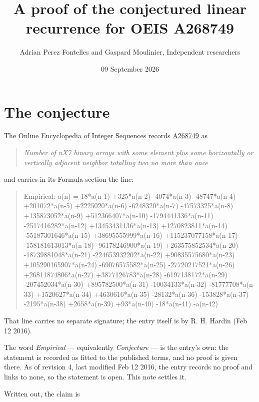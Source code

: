 \documentclass[11pt]{article}
\title{A proof of the conjectured linear recurrence for OEIS A268749}
\author{Adrian Perez Fontelles and Gaspard Moulinier, Independent researchers}
\date{09 September 2026}
\theoremstyle{definition}
\begin{document}
\maketitle
\section{The conjecture}

The Online Encyclopedia of Integer Sequences records \href{https://oeis.org/A268749}{A268749} as

\begin{quote}\itshape Number of nX7 binary arrays with some element plus some horizontally or vertically adjacent neighbor totalling two no more than once\end{quote}

and carries in its Formula section the line:

\begin{quote}\ttfamily Empirical: a(n) = 18*a(n-1) +325*a(n-2) -4074*a(n-3) -48747*a(n-4) +201072*a(n-5) +2225020*a(n-6) -6248320*a(n-7) -47573325*a(n-8) +135873052*a(n-9) +512366407*a(n-10) -1794441336*a(n-11) -2517416282*a(n-12) +13453431136*a(n-13) +1270823811*a(n-14) -55187301646*a(n-15) +38695555999*a(n-16) +115237077158*a(n-17) -158181613013*a(n-18) -96178246900*a(n-19) +263575852534*a(n-20) -18739881048*a(n-21) -224653932202*a(n-22) +90835575680*a(n-23) +105290165907*a(n-24) -69076575582*a(n-25) -27720217521*a(n-26) +26811874806*a(n-27) +3877126783*a(n-28) -6197138172*a(n-29) -207452034*a(n-30) +895782500*a(n-31) -10034133*a(n-32) -81777708*a(n-33) +1520627*a(n-34) +4630616*a(n-35) -28132*a(n-36) -153828*a(n-37) -2195*a(n-38) +2658*a(n-39) +93*a(n-40) -18*a(n-41) -a(n-42)\end{quote}

That line carries no separate signature; the entry itself is by R. H. Hardin (Feb 12 2016).

The word {\itshape Empirical} --- equivalently {\itshape Conjecture} --- is the entry's own: the statement is recorded as fitted to the published terms, and no proof is given there. As of revision 4, last modified Feb 12 2016, the entry records no proof and links to none, so the statement is open. This note settles it.

Written out, the claim is
\end{document}
